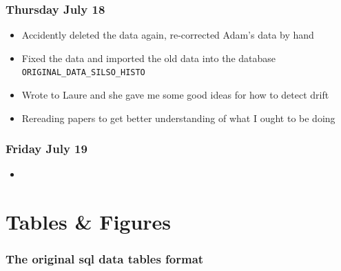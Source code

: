 \documentclass[12pt]{article}
\begin{document}
\subsubsection{Thursday July 18}
\begin{itemize}
    \item Accidently deleted the data again, re-corrected Adam's data by hand
    \item Fixed the data and imported the old data into the database \texttt{ORIGINAL\_DATA\_SILSO\_HISTO}
    \item Wrote to Laure and she gave me some good ideas for how to detect drift
    \item Rereading papers to get better understanding of what I ought to be doing
\end{itemize}

\subsubsection{Friday July 19}
\begin{itemize}
    \item 
\end{itemize}


\section{Tables & Figures}

\subsubsection{The original sql data tables format}
\end{document}
